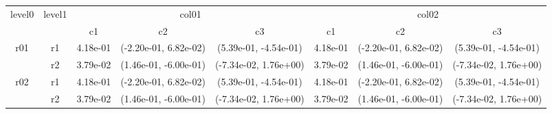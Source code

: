 \begin{tabular}{cccccccc}
\toprule
\multirow{2}{*}{level0} & \multirow{2}{*}{level1}&\multicolumn{3}{c}{col01}&\multicolumn{3}{c}{col02}\tabularnewline
\cmidrule(lr){3-5}
\cmidrule(lr){6-8}
&&c1&c2&c3&c1&c2&c3\tabularnewline
\midrule
\midrule
\multirow{2}{*}{r01}&r1&4.18e-01& (-2.20e-01, 6.82e-02)& (5.39e-01, -4.54e-01)&4.18e-01& (-2.20e-01, 6.82e-02)& (5.39e-01, -4.54e-01)\tabularnewline
&r2&3.79e-02& (1.46e-01, -6.00e-01)& (-7.34e-02, 1.76e+00)&3.79e-02& (1.46e-01, -6.00e-01)& (-7.34e-02, 1.76e+00)\tabularnewline
\midrule
\multirow{2}{*}{r02}&r1&4.18e-01& (-2.20e-01, 6.82e-02)& (5.39e-01, -4.54e-01)&4.18e-01& (-2.20e-01, 6.82e-02)& (5.39e-01, -4.54e-01)\tabularnewline
&r2&3.79e-02& (1.46e-01, -6.00e-01)& (-7.34e-02, 1.76e+00)&3.79e-02& (1.46e-01, -6.00e-01)& (-7.34e-02, 1.76e+00)\tabularnewline
\bottomrule
\end{tabular}
